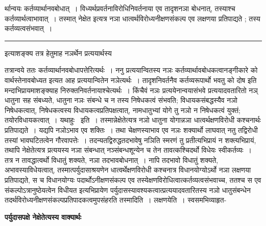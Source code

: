 \documentclass[11pt, openany]{book}
\newcommand\alfootnote[1]{%
  \begingroup
  \renewcommand\thefootnoteA{}\footnoteA{#1}%
  \addtocounter{footnoteA}{-1}%
  \endgroup
}
\begin{document}
\newpage
\fancyhead[LO]{द्विविधम् ]}
{\bl\noindent र्थान्वयः कर्तव्यार्थानवबोधात्~। विध्यर्थप्रवर्तनाविरोधिनिवर्तनाया एव तादृशनञा बोधनात्, तस्याश्च कर्तव्यार्थत्वाभावात्~। तस्मात् {\qt नेक्षेत} इत्यत्र नञा धात्वर्थविरोध्यनीक्षणसंकल्प एव लक्षणया प्रतिपाद्यते ; तस्य कर्तव्यत्वसंभवात्~।}\\
\hrule
\vspace{3mm}
\noindent
इत्याशङ्क्य तत्र हेतुमाह नञर्थेन प्रत्ययार्थस्य \alfootnote{टिप्प०\textemdash\ $^{1}$प्रकृतवाक्य इत्यर्थः~।}\footnotemarkA[1]तत्रान्वये ततः कर्तव्यार्थानवबोधापत्तेरित्यर्थः~। {\br ननु} प्रत्ययान्वितस्य नञः कर्तव्यार्थावबोधकत्वानङ्गीकारे को वार्थस्तेनावबोध्यत इत्यत आह प्रत्ययान्वितेन नञेत्यर्थः~। तादृशनिवर्तनैव कर्तव्यरूपार्थो भवतु को दोष इति मन्दाभिप्रायमाशङ्क्याह निरुक्तनिवर्तनायाश्चेत्यर्थः~। किंचैवं नञः प्रत्ययेनान्वयासंभवे प्रत्ययादवतारितो नञ् धातुना सह संबध्यते,  धातुना नञः संबन्धे च न तस्य निषेधकत्वं संभवति; विधायकसंबद्धस्यैव नञो निषेधकत्वात्, निषेधकत्वस्य विधायकत्वप्रतिपक्षत्वात्, नामधातुभ्यां योगे तु नञो न निषेधकत्वं युक्तं; तयोरविधायकत्वात्~। यथाहुः~  इति~। तस्मान्नेक्षेतेत्यत्र नञो धातुना योगान्नञा  धात्वर्थक्षणविरोधी कश्चनार्थः प्रतिपाद्यते~। यद्यपि नञोऽभाव एव शक्तिः~। तथा चेक्षणस्याभाव एव नञः शक्यार्थो लाघवात् नतु तद्विरोधी तस्यां भावघटितत्वेन गौरवापत्तेः~। तदन्यतद्विरुद्धतदभावेषु नञिति स्मरणं तु प्रतीत्यभिप्रायं न शक्त्यभिप्रायं, तथापि
नेक्षेतेत्यत्र प्रत्ययस्य नञा संबन्धात् नञ्संबन्धशून्येन च तेन तावत्कश्चिदर्थो विधेयः स्वीकर्तव्यः~। तत्र न तावद्धात्वर्थो विधातुं शक्यते, नञा तदभावबोधनात्~। नापि तदभावो विधातुं शक्यते, अभावस्याविधेयत्वात्, तस्मात्पर्युदासाश्रयणेन  धात्वर्थेक्षणविरोधी कश्चनात्र विधानयोग्योऽर्थो नञा लक्षणया प्रतिपाद्यते, स च  विधानयोग्यः पदार्थोऽनीक्षणसंकल्प एव तस्येक्षणविरोधित्वात्कर्तव्यत्वसंभवाच्च,  ततश्च स एव संकल्पोऽत्रानुष्ठेयत्वेन विधीयत इत्यभिप्रायेण पर्युदासस्यावश्यकत्वात्प्रत्ययादवतारितस्य नञो धातुसंबन्धेन
तदर्थविरोध्यनीक्षणसंकल्पप्रतिपादकत्वमुपसंहरति {\br तस्मादिति~। लक्षणयेति~।} स्वसमभिव्याहृत-
\newpage
\fancyhead[RE]{[ पर्यु०नेक्षे०वाक्यार्थः ]}
\begin{center}
 \textbf{पर्युदासपक्षे नेक्षेतेत्यस्य वाक्यार्थः }   
\end{center}
 
\end{document}
